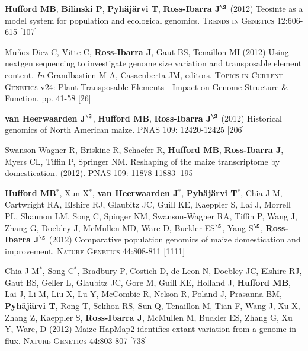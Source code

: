 \documentclass[letterpaper,10pt]{article}
\begin{document}
\begin{etaremune}
\item {\bf Hufford MB}, {\bf Bilinski P}, {\bf Pyh\"aj\"arvi T}, {\bf Ross-Ibarra J}$^\S$ (2012) Teosinte as a model system for population and ecological genomics. \textsc{Trends in Genetics} 12:606-615 %
{} [107]\\


\item Mu\~{n}oz Diez C, Vitte C, {\bf Ross-Ibarra J}, Gaut BS, Tenaillon MI (2012) Using nextgen sequencing to investigate genome size variation and transposable element content. \emph{In} Grandbastien M-A, Casacuberta JM, editors. \textsc{Topics in Current Genetics} v24: Plant Transposable Elements - Impact on Genome Structure \& Function. pp. 41-58
{} [26]\\


\item  {\bf van Heerwaarden J}$^\S$, {\bf Hufford MB}, {\bf Ross-Ibarra J}$^\S$ (2012) Historical genomics of North American maize. \textsc{PNAS} 109: 12420-12425
{} [206]\\


\item Swanson-Wagner R, Briskine R, Schaefer R, {\bf Hufford MB}, {\bf Ross-Ibarra J}, Myers CL, Tiffin P, Springer NM.  Reshaping of the maize transcriptome by domestication. (2012). \textsc{PNAS}  109: 11878-11883
{} [195]\\


\item {\bf Hufford MB}$^*$, Xun X$^*$, {\bf van Heerwaarden J}$^*$, {\bf Pyh\"aj\"arvi T}$^*$, Chia J-M, Cartwright RA, Elshire RJ, Glaubitz JC, Guill KE, Kaeppler S, Lai J, Morrell PL, Shannon LM, Song C, Spinger NM, Swanson-Wagner RA, Tiffin P, Wang J, Zhang G, Doebley J, McMullen MD, Ware D, Buckler ES$^\S$, Yang S$^\S$, {\bf Ross-Ibarra J}$^\S$ (2012) Comparative population genomics of maize domestication and improvement. \textsc{Nature Genetics} 44:808-811 %
{} [1111]\\


\item  Chia J-M$^*$, Song C$^*$, Bradbury P, Costich D, de Leon N, Doebley JC, Elshire RJ, Gaut BS, Geller L, Glaubitz JC, Gore M, Guill KE, Holland J,  {\bf Hufford MB}, Lai J, Li M, Liu X, Lu Y, McCombie R, Nelson R, Poland J, Prasanna BM,  {\bf Pyh\"aj\"arvi T}, Rong T, Sekhon RS,  Sun Q, Tenaillon M, Tian F, Wang J, Xu X, Zhang Z, Kaeppler S, {\bf Ross-Ibarra J}, McMullen M, Buckler ES, Zhang G, Xu Y, Ware, D (2012) Maize HapMap2 identifies extant variation from a genome in flux. \textsc{Nature Genetics} 44:803-807 %
{} [738]\\



\end{etaremune}
\end{document}
